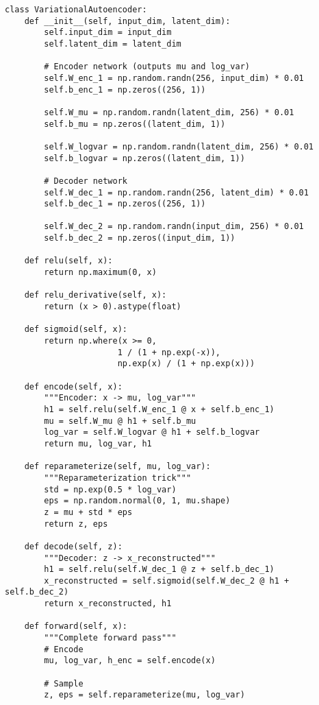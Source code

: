 ﻿\documentclass[12pt,a4paper]{article}
\begin{document}
\begin{lstlisting}
class VariationalAutoencoder:
    def __init__(self, input_dim, latent_dim):
        self.input_dim = input_dim
        self.latent_dim = latent_dim
        
        # Encoder network (outputs mu and log_var)
        self.W_enc_1 = np.random.randn(256, input_dim) * 0.01
        self.b_enc_1 = np.zeros((256, 1))
        
        self.W_mu = np.random.randn(latent_dim, 256) * 0.01
        self.b_mu = np.zeros((latent_dim, 1))
        
        self.W_logvar = np.random.randn(latent_dim, 256) * 0.01
        self.b_logvar = np.zeros((latent_dim, 1))
        
        # Decoder network
        self.W_dec_1 = np.random.randn(256, latent_dim) * 0.01
        self.b_dec_1 = np.zeros((256, 1))
        
        self.W_dec_2 = np.random.randn(input_dim, 256) * 0.01
        self.b_dec_2 = np.zeros((input_dim, 1))
    
    def relu(self, x):
        return np.maximum(0, x)
    
    def relu_derivative(self, x):
        return (x > 0).astype(float)
    
    def sigmoid(self, x):
        return np.where(x >= 0,
                       1 / (1 + np.exp(-x)),
                       np.exp(x) / (1 + np.exp(x)))
    
    def encode(self, x):
        """Encoder: x -> mu, log_var"""
        h1 = self.relu(self.W_enc_1 @ x + self.b_enc_1)
        mu = self.W_mu @ h1 + self.b_mu
        log_var = self.W_logvar @ h1 + self.b_logvar
        return mu, log_var, h1
    
    def reparameterize(self, mu, log_var):
        """Reparameterization trick"""
        std = np.exp(0.5 * log_var)
        eps = np.random.normal(0, 1, mu.shape)
        z = mu + std * eps
        return z, eps
    
    def decode(self, z):
        """Decoder: z -> x_reconstructed"""
        h1 = self.relu(self.W_dec_1 @ z + self.b_dec_1)
        x_reconstructed = self.sigmoid(self.W_dec_2 @ h1 + self.b_dec_2)
        return x_reconstructed, h1
    
    def forward(self, x):
        """Complete forward pass"""
        # Encode
        mu, log_var, h_enc = self.encode(x)
        
        # Sample
        z, eps = self.reparameterize(mu, log_var)
        

\end{lstlisting}
\end{document}
